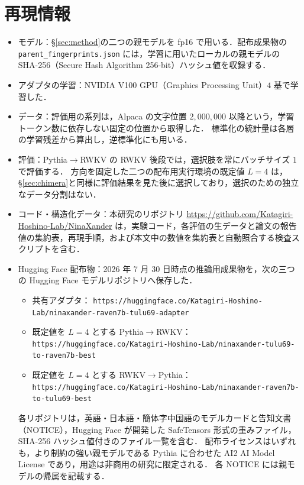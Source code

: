 \documentclass[techrep,noauthor]{ipsj}
\providecommand{\href}[2]{#2}
\newcommand{\rev}[1]{{\color{blue}#1}}
\newcommand{\RtoP}{\textsf{RWKV$\to$\allowbreak Pythia}}
\newcommand{\PtoR}{\textsf{Pythia$\to$\allowbreak RWKV}}
\newcommand{\hfrepo}[2]{%
  \href{#1}{%
    \texttt{https://huggingface.co/}\allowbreak\texttt{Katagiri-Hoshino-Lab/}\allowbreak\texttt{#2}}}
\begin{document}
\section{\rev{再現情報}}\label{sec:repro}
{\color{blue}
\begin{itemize}\setlength{\itemsep}{1pt}\raggedright
\item モデル：\S\ref{sec:method}の二つの親モデルを fp16 で用いる．配布成果物の
\texttt{parent\_fingerprints.json} には，学習に用いたローカルの親モデルの SHA-256（Secure Hash Algorithm 256-bit）ハッシュ値を収録する．
\item アダプタの学習：NVIDIA V100 GPU（Graphics Processing Unit）$4$ 基で学習した．
\item データ：評価用の系列は，Alpaca の文字位置 $2{,}000{,}000$ 以降という，学習トークン数に依存しない固定の位置から取得した．
標準化の統計量は各層の学習残差から算出し，逆標準化にも用いる．
\item 評価：\PtoR{} の RWKV 後段では，選択肢を常にバッチサイズ $1$ で評価する．
{\color{red}方向を固定した二つの配布用実行環境の既定値 $L{=}4$ は，\S\ref{sec:chimera}と同様に評価結果を見た後に選択しており，選択のための独立なデータ分割はない．}
\item コード・構造化データ：本研究のリポジトリ
\url{https://github.com/Katagiri-Hoshino-Lab/NinaXander}
は，実験コード，各評価の生データと論文の報告値の集約表，再現手順，および本文中の数値を集約表と自動照合する検査スクリプトを含む．
\item Hugging Face 配布物：2026 年 7 月 30 日時点の推論用成果物を，次の三つの Hugging Face モデルリポジトリへ保存した．
\begin{itemize}\setlength{\itemsep}{0pt}\raggedright
\item 共有アダプタ：\hfrepo
  {https://huggingface.co/Katagiri-Hoshino-Lab/ninaxander-raven7b-tulu69-adapter}
  {ninaxander-raven7b-tulu69-adapter}
\item 既定値を $L{=}4$ とする \PtoR{}：\hfrepo
  {https://huggingface.co/Katagiri-Hoshino-Lab/ninaxander-tulu69-to-raven7b-best}
  {ninaxander-tulu69-to-raven7b-best}
\item 既定値を $L{=}4$ とする \RtoP{}：\hfrepo
  {https://huggingface.co/Katagiri-Hoshino-Lab/ninaxander-raven7b-to-tulu69-best}
  {ninaxander-raven7b-to-tulu69-best}
\end{itemize}
各リポジトリは，英語・日本語・簡体字中国語のモデルカードと告知文書（NOTICE），Hugging Face が開発した SafeTensors 形式の重みファイル，SHA-256 ハッシュ値付きのファイル一覧を含む．
配布ライセンスはいずれも，より制約の強い親モデルである Pythia に合わせた AI2 AI Model License であり，用途は非商用の研究に限定される．
各 NOTICE には親モデルの帰属を記載する．
\end{itemize}
}
\end{document}
